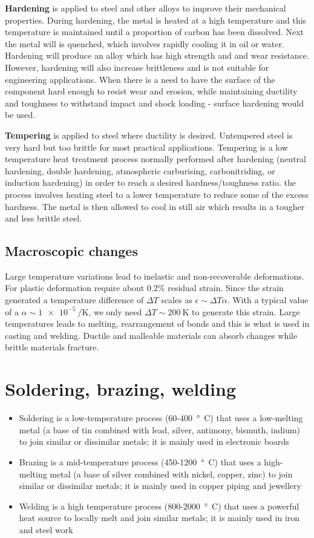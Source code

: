 \textbf{Hardening} is applied to steel and other alloys to improve their mechanical properties. During hardening, the metal is heated at a high temperature and this temperature is maintained until a proportion of carbon has been dissolved. Next the metal will is quenched, which involves rapidly cooling it in oil or water. Hardening will produce an alloy which has high strength and and wear resistance. However, hardening will also increase brittleness and is not suitable for engineering applications. When there is a need to have the surface of the component hard enough to resist wear and erosion, while maintaining ductility and toughness to withstand impact and shock loading - surface hardening would be used.

\textbf{Tempering} is applied to steel where ductility is desired. Untempered steel is very hard but too brittle for most practical applications. Tempering is a low temperature heat treatment process normally performed after hardening (neutral hardening, double hardening, atmospheric carburising, carbonitriding, or induction hardening) in order to reach a desired hardness/toughness ratio. the process involves heating steel to a lower temperature to reduce some of the excess hardness. The metal is then allowed to cool in still air which results in a tougher and less brittle steel.
\subsection{Macroscopic changes}
Large temperature variations lead to inelastic and non-recoverable deformations. For plastic deformation require about 0.2\% residual strain. Since the strain generated a temperature difference of $\Delta T$ scales as $\epsilon \sim \Delta T \alpha$. With a typical value of a $\alpha \sim \SI{1e-5}{\per\kelvin}$, we only need $\Delta T \sim \SI{200}{\kelvin}$ to generate this strain. Large temperatures leads to melting, rearrangement of bonds and this is what is used in casting and welding. Ductile and malleable materials can absorb changes while brittle materials fracture.
\section{Soldering, brazing, welding}
\begin{itemize}
    \item Soldering is a low-temperature process (60-\SI{400}{\degree C}) that uses a low-melting metal (a base of tin combined with lead, silver, antimony, bismuth, indium) to join similar or dissimilar metals; it is mainly used in electronic boards
    \item Brazing is a mid-temperature process (450-\SI{1200}{\degree C}) that uses a high-melting metal (a base of silver combined with nickel, copper, zinc) to join similar or dissimilar metals; it is mainly used in copper piping and jewellery
    \item Welding is a high temperature process (800-\SI{2000}{\degree C}) that uses a powerful heat source to locally melt and join similar metals; it is mainly used in iron and steel work
\end{itemize}